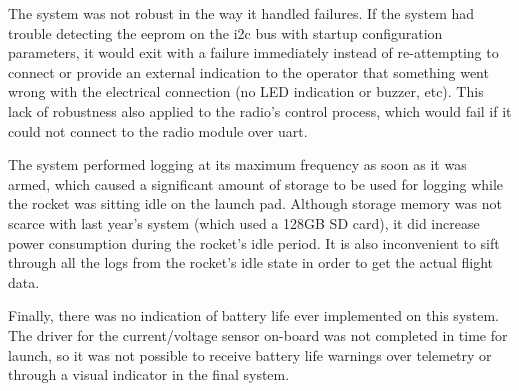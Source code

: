 The system was not robust in the way it handled failures. If the system had trouble detecting the \gls{eeprom} on the
\gls{i2c} bus with startup configuration parameters, it would exit with a failure immediately instead of re-attempting
to connect or provide an external indication to the operator that something went wrong with the electrical connection
(no LED indication or buzzer, etc). This lack of robustness also applied to the radio's control process, which would
fail if it could not connect to the radio module over \gls{uart}.

The system performed logging at its maximum frequency as soon as it was armed, which caused a significant amount of
storage to be used for logging while the rocket was sitting idle on the launch pad. Although storage memory was not
scarce with last year's system (which used a 128GB SD card), it did increase power consumption during the rocket's idle
period. It is also inconvenient to sift through all the logs from the rocket's idle state in order to get the actual
flight data.

Finally, there was no indication of battery life ever implemented on this system. The driver for the current/voltage
sensor on-board was not completed in time for launch, so it was not possible to receive battery life warnings over
telemetry or through a visual indicator in the final system.
